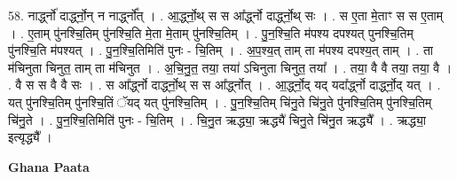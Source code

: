 \documentclass[17pt]{extarticle}
\begin{document}
58. नार्द्ध्नो॑ दार्द्ध्नो॒न् न नार्द्ध्नो᳚त् । . आ॒र्द्ध्नो॒थ् स स आ᳚र्द्ध्नो दार्द्ध्नो॒थ् सः । . स ए॒ता मे॒ताꣳ स स ए॒ताम् । . ए॒ताम् पु॑नश्चि॒तिम् पु॑नश्चि॒ति मे॒ता मे॒ताम् पु॑नश्चि॒तिम् । . पु॒न॒श्चि॒ति म॑पश्य दपश्यत् पुनश्चि॒तिम् पु॑नश्चि॒ति म॑पश्यत् । . पु॒न॒श्चि॒तिमिति॑ पुनः - चि॒तिम् । . अ॒प॒श्य॒त् ताम् ता म॑पश्य दपश्य॒त् ताम् । . ता म॑चिनुता चिनुत॒ ताम् ता म॑चिनुत । . अ॒चि॒नु॒त॒ तया॒ तया॑ ऽचिनुता चिनुत॒ तया᳚ । . तया॒ वै वै तया॒ तया॒ वै । . वै स स वै वै सः । . स आ᳚र्द्ध्नो दार्द्ध्नो॒थ् स स आ᳚र्द्ध्नोत् । . आ॒र्द्ध्नो॒द् यद् यदा᳚र्द्ध्नो दार्द्ध्नो॒द् यत् । . यत् पु॑नश्चि॒तिम् पु॑नश्चि॒तिं ॅयद् यत् पु॑नश्चि॒तिम् । . पु॒न॒श्चि॒तिम् चि॑नु॒ते चि॑नु॒ते पु॑नश्चि॒तिम् पु॑नश्चि॒तिम् चि॑नु॒ते । . पु॒न॒श्चि॒तिमिति॑ पुनः - चि॒तिम् । . चि॒नु॒त ऋद्ध्या॒ ऋद्ध्यै॑ चिनु॒ते चि॑नु॒त ऋद्ध्यै᳚ । . ऋद्ध्या॒ इत्यृद्ध्यै᳚ । \newline

\textbf{Ghana Paata } \newline
\end{document}
